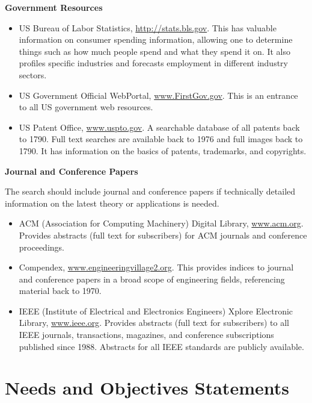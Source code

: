 \textbf{Government Resources}

\begin{itemize}
\item
  US Bureau of Labor Statistics, \url{http://stats.bls.gov}. This has
  valuable information on consumer spending information, allowing one to
  determine things such as how much people spend and what they spend it
  on. It also profiles specific industries and forecasts employment in
  different industry sectors.
\item
  US Government Official WebPortal,
  \href{http://www.FirstGov.gov}{www.FirstGov.gov}. This is an entrance
  to all US government web resources.
\item
  US Patent Office, \href{http://www.uspto.gov}{www.uspto.gov}. A
  searchable database of all patents back to 1790. Full text searches
  are available back to 1976 and full images back to 1790. It has
  information on the basics of patents, trademarks, and copyrights.
\end{itemize}

\textbf{Journal and Conference Papers}

The search should include journal and conference papers if technically
detailed information on the latest theory or applications is needed.

\begin{itemize}
\item
  ACM (Association for Computing Machinery) Digital Library,
  \href{http://www.acm.org}{www.acm.org}. Provides abstracts (full text
  for subscribers) for ACM journals and conference proceedings.
\item
  Compendex,
  \href{http://www.engineeringvillage2.org}{www.engineeringvillage2.org}.
  This provides indices to journal and conference papers in a broad
  scope of engineering fields, referencing material back to 1970.
\item
  IEEE (Institute of Electrical and Electronics Engineers) Xplore
  Electronic Library, \href{http://www.ieee.org}{www.ieee.org}. Provides
  abstracts (full text for subscribers) to all IEEE journals,
  transactions, magazines, and conference subscriptions published since
  1988. Abstracts for all IEEE standards are publicly available.
\end{itemize}

\section{Needs and Objectives Statements}
\label{section:needs-and-objectives-statements}

